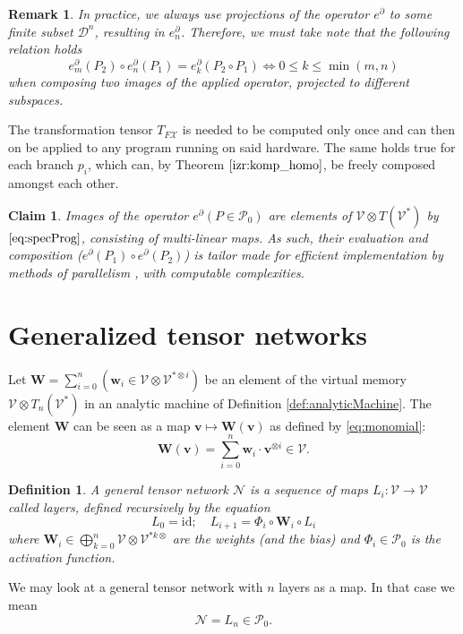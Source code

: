 \documentclass[smallcondensed]{svjour3}
\newcommand{\bfW}{\mathbf{W}}
\newcommand{\bfw}{\mathbf{w}}
\newcommand{\VV}{\mathcal{V}}
\newcommand{\NN}{\mathcal{N}}
\newcommand{\vv}{\mathbf{v}}
\newcommand{\X}{\mathcal{X}}
\newcommand{\dP}{\mathcal{P}}
\newcommand{\D}{\partial}
\newcommand{\DD}{\mathcal{D}}
\newtheorem{definicija}{Definition}[section]
\newtheorem{trditev}{Claim}[section]
\newtheorem{opomba}{Remark}[section]
\begin{document}
\begin{opomba}
In practice, we always use projections of the operator $e^\D$ to some finite subset $\DD^n$, resulting in $e^\D_n$. Therefore, we must take note that the following relation holds
\begin{equation}
e^\D_m(P_2)\circ e^\D_n(P_1)=e^\D_k(P_2\circ P_1)\iff 0\le k\le \min(m,n)
\end{equation}
when composing two images of the applied operator, projected to different subspaces.
\end{opomba}

The transformation tensor $T_{F\X}$ is needed to be computed only once and can then on be applied to any program running on said hardware. The same holds true for each branch $p_i$, which can, by Theorem $\ref{izr:komp_homo}$, be freely composed amongst each other.

\begin{trditev}\label{clm:paralel}
Images of the operator $e^\D (P\in\dP_0)$ are elements of $\VV\otimes T(\VV^*)$ by $\eqref{eq:specProg}$, consisting of multi-linear maps. As such, their evaluation and composition ($e^\D(P_1)\circ e^\D(P_2)$) is tailor made for efficient implementation by methods of parallelism \cite{TensorGPU}, with computable complexities.
\end{trditev}

\section{Generalized tensor networks}\label{sec:generalTensorNet}

Let $\bfW=\sum\limits_{i=0}^n(\bfw_i\in \VV\otimes \VV^{*\otimes i})$ be an element of the virtual memory $\VV\otimes T_n(\VV^*)$ in an
analytic machine of Definition \ref{def:analyticMachine}. The element $\bfW$ can
be seen as a map 
$\vv\mapsto \bfW(\vv)$ as defined by \eqref{eq:monomial}:
\begin{equation}
\bfW(\vv)=\sum\limits_{i=0}^n\bfw_i\cdot\vv^{\otimes i}\in \VV.
\end{equation}

\begin{definicija}
  \label{def:tensor_network}
A \emph{general tensor network} $\NN$ is a sequence of maps $L_i:\VV\to \VV$  called
\emph{layers}, defined recursively by the equation 
\begin{equation}
L_0=\mathrm{id};\quad L_{i+1}=\Phi_i\circ\mathbf{W}_i\circ L_i
\end{equation}
where $\mathbf{W}_i\in \bigoplus\limits_{k=0}^n\VV\otimes \VV^{*k\otimes}$ are
the \emph{weights} (and the bias) and $\Phi_i\in\dP_0$ is the \emph{activation
  function}.
\end{definicija}
We may look at a general tensor network with $n$ layers as a map. In that case
we mean
\begin{equation}
\NN=L_n\in\dP_0.
\end{equation}
\end{document}

